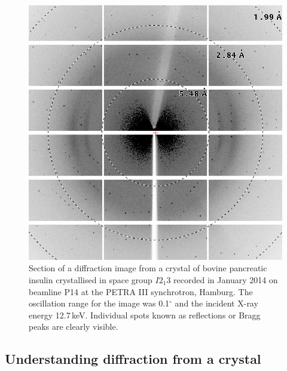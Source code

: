         \begin{figure}
            \centering
            \includegraphics[width=1\textwidth]{figures/introduction/InsulinDiffractionImage_zoom.png}
            \caption[Insulin diffraction image.]{Section of a diffraction image from a crystal of bovine pancreatic insulin crystallised in space group $I2_1 3$ recorded in January 2014 on beamline P14 at the PETRA III synchrotron, Hamburg.
            The oscillation range for the image was 0.1$^{\circ}$ and the incident X-ray energy 12.7\,keV.
            Individual spots known as reflections or Bragg peaks are clearly visible.}
            \label{fig:Insulin diffraction image}
        \end{figure}

    \subsection{Understanding diffraction from a crystal}
    \label{sub:Understanding diffraction from a crystal}

